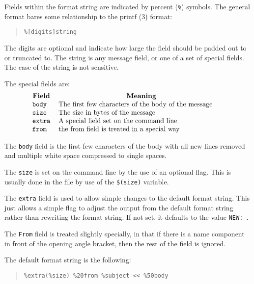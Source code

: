 Fields within the format string are indicated by percent (\verb|%|)
symbols. The general format bares some relationship to the \man
printf (3) format:

\begin{quote}\small\begin{verbatim}
%[digits]string
\end{verbatim}\end{quote}

The digits are optional and indicate how large the field should be
padded out to or truncated to. The string is any message field, or
one of a set of special fields. The case of the string is not sensitive.

The special fields are:
\[\begin{tabular}{l p{0.7\linewidth}}
	\multicolumn{1}{c}{\bf Field} &
		\multicolumn{1}{c}{\bf Meaning} \\
	\tt body&	The first few characters of the body of the message\\
	\tt size&	The size in bytes of the message\\
	\tt extra&	A special field set on the command line\\
	\tt from&	the from field is treated in a special way\\
\end{tabular}\]

The \verb|body| field is the first few characters of the
body with all new lines removed and multiple white space compressed to
single spaces.

The \verb|size| is set on the command line by the use of
an optional flag. This is usually done in the  file
by use of the \verb|$(size)| variable.

The \verb|extra| field is used to allow simple changes to
the default format string. This just allows a simple flag to adjust
the output from the default format string rather than rewriting the
format string. If not set, it defaults to the value \verb*|NEW: |.

The \verb|From| field is treated slightly specially, in
that if there is a name component in front of the opening angle
bracket, then the rest of the field is ignored.

The default format string is the following:
\begin{quote}\small\begin{verbatim}
%extra(%size) %20from %subject << %50body
\end{verbatim}\end{quote}

